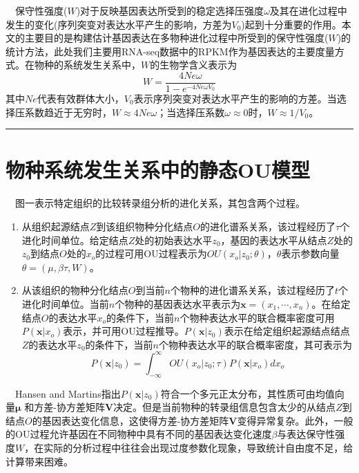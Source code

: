 \documentclass[hyperref,]{ctexart}
\begin{document}
 保守性强度(\(W\))对于反映基因表达所受到的稳定选择压强度\(\omega\)及其在进化过程中发生的变化(序列突变对表达水平产生的影响，方差为\(V_0\))起到十分重要的作用。本文的主要目的是构建估计基因表达在多物种进化过程中所受到的保守性强度(\(W\))的统计方法，此处我们主要用RNA-seq数据中的RPKM作为基因表达的主要度量方式。在物种的系统发生关系中，\(W\)的生物学含义表示为
\[W=\frac{4Ne \omega}{1-e^{-4Ne\omega V_0}}\]
其中\(Ne\)代表有效群体大小，\(V_0\)表示序列突变对表达水平产生的影响的方差。当选择压系数趋近于无穷时，\(W\approx4Ne\omega\)；当选择压系数\(\omega\approx0\)时，\(W\approx1/V_0\)。

\begin{center}\rule{0.5\linewidth}{\linethickness}\end{center}

\hypertarget{ou}{%
\section{物种系统发生关系中的静态OU模型}\label{ou}}

 图一表示特定组织的比较转录组分析的进化关系，其包含两个过程。

\begin{enumerate}
\def\labelenumi{\arabic{enumi}.}
\item
  从组织起源结点\(Z\)到该组织物种分化结点\(O\)的进化谱系关系，该过程经历了\(\tau\)个进化时间单位。给定结点\(Z\)处的初始表达水平\(z_0\)，基因的表达水平从结点\(Z\)处的\(z_0\)到结点\(O\)处的\(x_o\)的过程可用OU过程表示为\(OU(x_o|z_0;\theta)\)，\(\theta\)表示参数向量\(\theta=(\mu, \beta \tau, W)\)。
\item
  从该组织的物种分化结点\(O\)到当前\(n\)个物种的进化谱系关系，该过程经历了\(t\)个进化时间单位。当前\(n\)个物种的基因表达水平表示为\(\boldsymbol{x}=(x_1,\cdots,x_n)\)。在给定结点\(O\)的表达水平\(x_o\)的条件下，当前\(n\)个物种表达水平的联合概率密度可用\(P(\boldsymbol{x}|x_o)\)表示，并可用OU过程推导。\(P(\boldsymbol{x}|z_0)\)表示在给定组织起源结点结点\(Z\)的表达水平\(z_0\)的条件下，当前\(n\)个物种表达水平的联合概率密度，其可表示为
  \[P(\boldsymbol{x}|z_0)=\int_{-\infty}^{\infty}OU\left(x_o|z_0;\tau\right)P\left(\boldsymbol{x}|x_o\right)dx_o\]
\end{enumerate}

 Hansen and
Martins指出\(P(\boldsymbol{x}|z_0)\)符合一个多元正太分布，其性质可由均值向量\(\boldsymbol{\mu}\)
和方差-协方差矩阵\(\boldsymbol{V}\)决定。但是当前物种的转录组信息包含太少的从结点\(Z\)到结点\(O\)的基因表达变化信息，这使得方差-协方差矩阵\(\boldsymbol{V}\)变得异常复杂。此外，一般的OU过程允许基因在不同物种中具有不同的基因表达变化速度\(\beta\)与表达保守性强度\(W\)，在实际的分析过程中往往会出现过度参数化现象，导致统计自由度不足，给计算带来困难。
\end{document}
